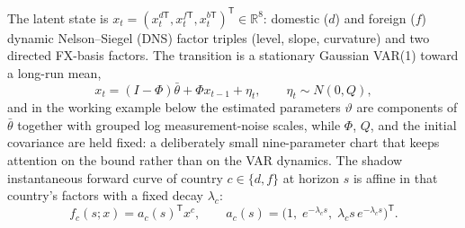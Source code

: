 \documentclass[11pt]{article}
\begin{document}
The latent state is
\(x_t=(x_t^{d\mathsf T},x_t^{f\mathsf T},x_t^{b\mathsf T})^{\mathsf T}
\in\mathbb R^8\): domestic (\(d\)) and foreign (\(f\)) dynamic
Nelson--Siegel (DNS) factor triples (level, slope, curvature) and
two directed FX-basis factors. The transition is a stationary Gaussian
VAR(1) toward a long-run mean,
\begin{equation}\label{eq:75}
 x_t=(I-\Phi)\bar\theta+\Phi x_{t-1}+\eta_t,
 \qquad \eta_t\sim N(0,Q),
\end{equation}
and in the working example below the estimated parameters \(\vartheta\)
are components of \(\bar\theta\) together with grouped log
measurement-noise scales, while \(\Phi\), \(Q\), and the initial
covariance are held fixed: a deliberately small nine-parameter chart
that keeps attention on the bound rather than on the VAR dynamics. The
shadow instantaneous forward curve of country \(c\in\{d,f\}\) at horizon
\(s\) is affine in that country's factors with a fixed decay
\(\lambda_c\):
\begin{equation}\label{eq:76}
 f_c(s;x)=a_c(s)^{\mathsf T}x^c,
 \qquad
 a_c(s)=\bigl(1,\;e^{-\lambda_c s},\;\lambda_c s\,e^{-\lambda_c s}
 \bigr)^{\mathsf T}.
\end{equation}
\end{document}
